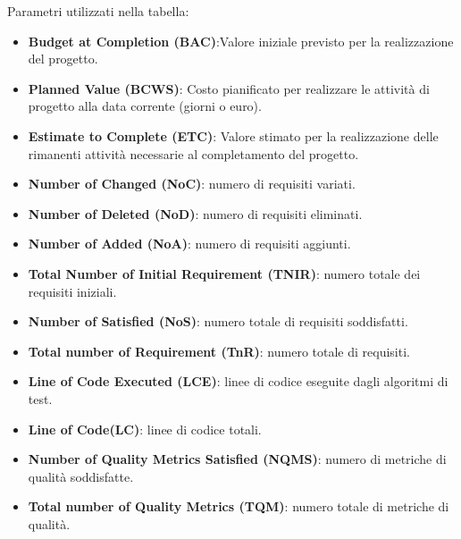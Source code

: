 Parametri utilizzati nella tabella:
\begin{itemize}
    \item \textbf{Budget at Completion (BAC)}:Valore iniziale previsto per la realizzazione del progetto.
    \item \textbf{Planned Value (BCWS)}: Costo pianificato per realizzare le attività di progetto alla data corrente (giorni o euro).
    \item \textbf{Estimate to Complete (ETC)}: Valore stimato per la realizzazione delle rimanenti attività necessarie al completamento del progetto.
    \item \textbf{Number of Changed (NoC)}: numero di requisiti variati.
    \item \textbf{Number of Deleted (NoD)}: numero di requisiti eliminati.
    \item \textbf{Number of Added (NoA)}: numero di requisiti aggiunti.
    \item \textbf{Total Number of Initial Requirement (TNIR)}: numero totale dei requisiti iniziali.
    \item \textbf{Number of Satisfied (NoS)}: numero totale di requisiti soddisfatti.
    \item \textbf{Total number of Requirement (TnR)}: numero totale di requisiti.
    \item \textbf{Line of Code Executed (LCE)}: linee di codice eseguite dagli algoritmi di test.
    \item \textbf{Line of Code(LC)}: linee di codice totali.
    \item \textbf{Number of Quality Metrics Satisfied (NQMS)}: numero di metriche di qualità soddisfatte.
    \item \textbf{Total number of Quality Metrics (TQM)}: numero totale di metriche di qualità.
\end{itemize}

\setlength\extrarowheight{5pt}

